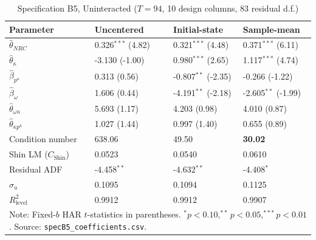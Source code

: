 \documentclass[11pt,a4paper]{article}
\begin{document}
\begin{table}[H]
\centering
\caption{Specification B5, Uninteracted ($T = 94$, 10 design columns, 83 residual d.f.)}
\label{tab:b5_nointer}
\small
\begin{tabular}{p{5.2cm}p{2.9cm}p{2.9cm}p{2.9cm}}
\toprule
Parameter & Uncentered & Initial-state & Sample-mean \\
\midrule
$\hat{\theta}_{NRC}$ & 0.326$^{***}$ (4.82) & 0.321$^{***}$ (4.48) & 0.371$^{***}$ (6.11) \\
$\hat{\theta}_{\kappa}$ & -3.130 (-1.00) & 0.980$^{***}$ (2.65) & 1.117$^{***}$ (4.74) \\
$\hat{\beta}_{p^{\kappa}}$ & 0.313 (0.56) & -0.807$^{**}$ (-2.35) & -0.266 (-1.22) \\
$\hat{\beta}_{\omega}$ & 1.606 (0.44) & -4.191$^{**}$ (-2.18) & -2.605$^{**}$ (-1.99) \\
$\hat{\theta}_{\omega\kappa}$ & 5.693 (1.17) & 4.203 (0.98) & 4.010 (0.87) \\
$\hat{\theta}_{\kappa p^{\kappa}}$ & 1.027 (1.44) & 0.997 (1.40) & 0.655 (0.89) \\
\midrule
Condition number & 638.06 & 49.50 & \textbf{30.02} \\
Shin LM ($C_{\text{Shin}}$) & 0.0523 & 0.0540 & 0.0610 \\
Residual ADF & -4.458$^{**}$ & -4.632$^{**}$ & -4.408$^{*}$ \\
$\hat{\sigma}_u$ & 0.1095 & 0.1094 & 0.1125 \\
$R^2_{\text{level}}$ & 0.9912 & 0.9912 & 0.9907 \\
\bottomrule
\multicolumn{4}{p{15.5cm}}{\footnotesize Note: Fixed-$b$ HAR $t$-statistics in parentheses. $^{*}p<0.10, ^{**}p<0.05, ^{***}p<0.01$. Source: \texttt{specB5\_coefficients.csv}.}
\end{tabular}
\end{table}
\end{document}
